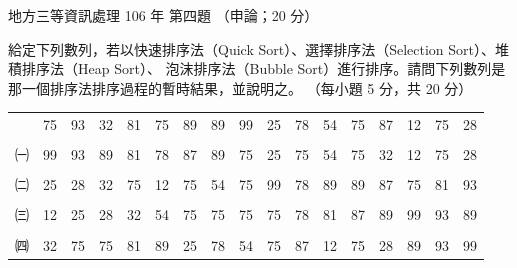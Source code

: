 \begin{pastexam}[label={px:df3-106-ds-04}]{地方三等資訊處理 106 年 第四題}
（申論；20 分）

給定下列數列，若以快速排序法（Quick Sort）、選擇排序法（Selection Sort）、堆積排序法（Heap Sort）、
泡沫排序法（Bubble Sort）進行排序。請問下列數列是那一個排序法排序過程的暫時結果，並說明之。
（每小題 5 分，共 20 分）
\begin{center}
\small
\begin{tabular}{r|*{16}{c|}}
\cline{2-17}
 & 75 & 93 & 32 & 81 & 75 & 89 & 89 & 99 & 25 & 78 & 54 & 75 & 87 & 12 & 75 & 28 \\
\cline{2-17}
\multicolumn{17}{c}{} \\[-0.6em]
\cline{2-17}
㈠ & 99 & 93 & 89 & 81 & 78 & 87 & 89 & 75 & 25 & 75 & 54 & 75 & 32 & 12 & 75 & 28 \\
\cline{2-17}
\multicolumn{17}{c}{} \\[-0.6em]
\cline{2-17}
㈡ & 25 & 28 & 32 & 75 & 12 & 75 & 54 & 75 & 99 & 78 & 89 & 89 & 87 & 75 & 81 & 93 \\
\cline{2-17}
\multicolumn{17}{c}{} \\[-0.6em]
\cline{2-17}
㈢ & 12 & 25 & 28 & 32 & 54 & 75 & 75 & 75 & 75 & 78 & 81 & 87 & 89 & 99 & 93 & 89 \\
\cline{2-17}
\multicolumn{17}{c}{} \\[-0.6em]
\cline{2-17}
㈣ & 32 & 75 & 75 & 81 & 89 & 25 & 78 & 54 & 75 & 87 & 12 & 75 & 28 & 89 & 93 & 99 \\
\cline{2-17}
\end{tabular}
\end{center}
\end{pastexam}

